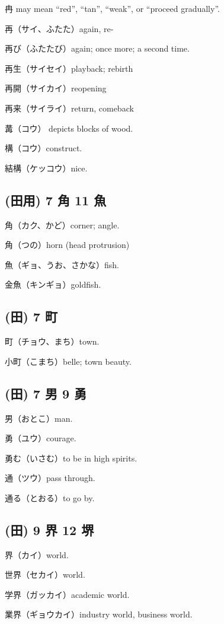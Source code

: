 冉 may mean ``red'', ``tan'', ``weak'', or ``proceed gradually''.

再（サイ、ふたた）again, re-

再び（ふたたび）again; once more; a second time.

再生（サイセイ）playback; rebirth

再開（サイカイ）reopening

再来（サイライ）return, comeback

冓（コウ） depicts blocks of wood.

構（コウ）construct.

結構（ケッコウ）nice.

\subsection{(田用) 7 角 11 魚}

角（カク、かど）corner; angle.

角（つの）horn (head protrusion)

魚（ギョ、うお、さかな）fish.

金魚（キンギョ）goldfish.

\subsection{(田) 7 町}

町（チョウ、まち）town.

小町（こまち）belle; town beauty.

\subsection{(田) 7 男 9 勇}

男（おとこ）man.

勇（ユウ）courage.

勇む（いさむ）to be in high spirits.

通（ツウ）pass through.

通る（とおる）to go by.

\subsection{(田) 9 界 12 堺}

界（カイ）world.

世界（セカイ）world.

学界（ガッカイ）academic world.

業界（ギョウカイ）industry world, business world.

